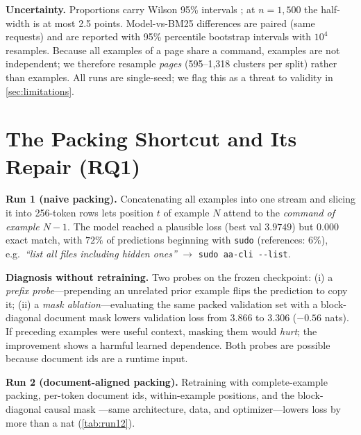 \documentclass[11pt,a4paper]{article}
\begin{document}
\textbf{Uncertainty.} Proportions carry Wilson 95\% intervals
\citep{wilson1927probable}; at $n{=}1{,}500$ the half-width is at most 2.5
points. Model-vs-BM25 differences are paired (same requests) and are reported
with 95\% percentile bootstrap intervals \citep{efron1993bootstrap} with
$10^4$ resamples. Because all examples of a page share a command, examples are
not independent; we therefore resample \emph{pages} (595--1{,}318 clusters
per split) rather than examples. All runs are single-seed; we flag this as a
threat to validity in \cref{sec:limitations}.

\section{The Packing Shortcut and Its Repair (RQ1)}
\label{sec:shortcut}

\textbf{Run 1 (naive packing).} Concatenating all examples into one stream and
slicing it into 256-token rows lets position $t$ of example $N$ attend to the
\emph{command of example $N{-}1$}. The model reached a plausible loss (best
val $3.9749$) but $0.000$ exact match, with $72\%$ of predictions beginning
with \texttt{sudo} (references: $6\%$), e.g.\ \emph{``list all files
including hidden ones''} $\rightarrow$ \texttt{sudo aa-cli -{}-list}.

\textbf{Diagnosis without retraining.} Two probes on the frozen checkpoint:
(i) a \emph{prefix probe}---prepending an unrelated prior example flips the
prediction to copy it; (ii) a \emph{mask ablation}---evaluating the same
packed validation set with a block-diagonal document mask lowers validation
loss from $3.866$ to $3.306$ ($-0.56$ nats). If preceding examples were useful
context, masking them would \emph{hurt}; the improvement shows a harmful
learned dependence. Both probes are possible because document ids are a
runtime input.

\textbf{Run 2 (document-aligned packing).} Retraining with complete-example
packing, per-token document ids, within-example positions, and the
block-diagonal causal mask \citep{krell2021packing}---same architecture, data,
and optimizer---lowers loss by more than a nat (\cref{tab:run12}).
\end{document}

